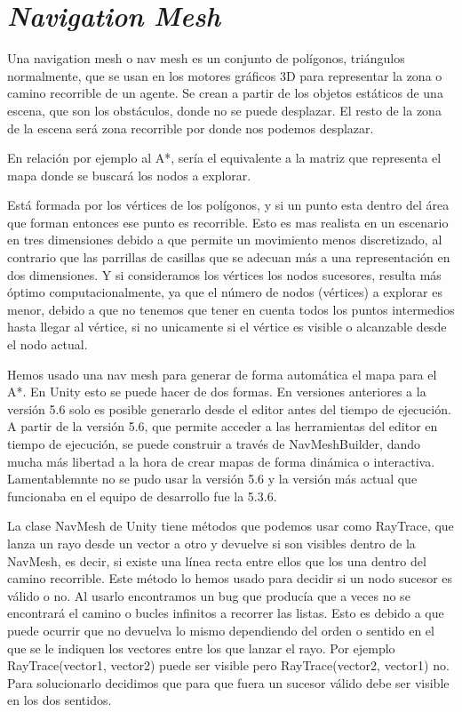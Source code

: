 
\section{\textit{Navigation Mesh}} \label{referenciaNavMesh}
Una navigation mesh o nav mesh es un conjunto de polígonos, triángulos normalmente, que se usan en los motores gráficos 3D para representar la zona o camino recorrible de un agente. Se crean a partir de los objetos estáticos de una escena, que son los obstáculos, donde no se puede desplazar. El resto de la zona de la escena será zona recorrible por donde nos podemos desplazar.

En relación por ejemplo al A*, sería el equivalente a la matriz que representa el mapa donde se buscará los nodos a explorar.

Está formada por los vértices de los polígonos, y si un punto esta dentro del área que forman entonces ese punto es recorrible. Esto es mas realista en un escenario en tres dimensiones debido a que permite un movimiento menos discretizado, al contrario que las parrillas de casillas que se adecuan más a una representación en dos dimensiones. Y si consideramos los vértices los nodos sucesores, resulta más óptimo computacionalmente, ya que el número de nodos (vértices) a explorar es menor, debido a que no tenemos que tener en cuenta todos los puntos intermedios hasta llegar al vértice, si no unicamente si el vértice es visible o alcanzable desde el nodo actual.

Hemos usado una nav mesh para generar de forma automática el mapa para el A*. En Unity esto se puede hacer de dos formas. En versiones anteriores a la versión 5.6 solo es posible generarlo desde el editor antes del tiempo de ejecución. A partir de la versión 5.6, que permite acceder a las herramientas del editor en tiempo de ejecución, se puede construir a través de NavMeshBuilder, dando mucha más libertad a la hora de crear mapas de forma dinámica o interactiva. Lamentablemnte no se pudo usar la versión 5.6 y la versión más actual que funcionaba en el equipo de desarrollo fue la 5.3.6.

La clase NavMesh de Unity tiene métodos que podemos usar como RayTrace, que lanza un rayo desde un vector a otro y devuelve si son visibles dentro de la NavMesh, es decir, si existe una línea recta entre ellos que los una dentro del camino recorrible. Este método lo hemos usado para decidir si un nodo sucesor es válido o no. Al usarlo encontramos un bug que producía que a veces no se encontrará el camino o bucles infinitos a recorrer las listas. Esto es debido a que puede ocurrir que no devuelva lo mismo dependiendo del orden o sentido en el que se le indiquen los vectores entre los que lanzar el rayo. Por ejemplo RayTrace(vector1, vector2) puede ser visible pero RayTrace(vector2, vector1) no. Para solucionarlo decidimos que para que fuera un sucesor válido debe ser visible en los dos sentidos.
